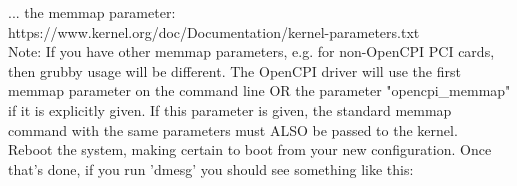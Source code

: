 \begin{flushleft}
... the memmap parameter:\\
https://www.kernel.org/doc/Documentation/kernel-parameters.txt\\

Note: If you have other memmap parameters, e.g. for non-OpenCPI PCI cards,
then grubby usage will be different. The OpenCPI driver will use the first
memmap parameter on the command line OR the parameter "opencpi\_memmap" if it
is explicitly given. If this parameter is given, the standard memmap command
with the same parameters must ALSO be passed to the kernel.\\

Reboot the system, making certain to boot from your new configuration.
Once that's done, if you run 'dmesg' you should see something like this:\\


\end{flushleft}
